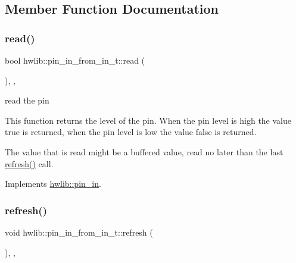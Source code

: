 \subsection{Member Function Documentation}
\mbox{\label{classhwlib_1_1pin__in__from__in__t_a981fa53647035e85ac71ec426c41b69f}} 
\subsubsection{\texorpdfstring{read()}{read()}}
{\footnotesize\ttfamily bool hwlib\+::pin\+\_\+in\+\_\+from\+\_\+in\+\_\+t\+::read (\begin{DoxyParamCaption}{ }\end{DoxyParamCaption})\hspace{0.3cm}{\ttfamily [inline]}, {\ttfamily [override]}, {\ttfamily [virtual]}}





read the pin

This function returns the level of the pin. When the pin level is high the value true is returned, when the pin level is low the value false is returned.

The value that is read might be a buffered value, read no later than the last \hyperlink{classhwlib_1_1pin__in__from__in__t_ae56094d43a2fe9d38fc52af4cfef4b2c}{refresh()} call. 

Implements \hyperlink{classhwlib_1_1pin__in_ad071bd2e17bb4af51390f6cbb728a194}{hwlib\+::pin\+\_\+in}.

\mbox{\label{classhwlib_1_1pin__in__from__in__t_ae56094d43a2fe9d38fc52af4cfef4b2c}} 
\subsubsection{\texorpdfstring{refresh()}{refresh()}}
{\footnotesize\ttfamily void hwlib\+::pin\+\_\+in\+\_\+from\+\_\+in\+\_\+t\+::refresh (\begin{DoxyParamCaption}{ }\end{DoxyParamCaption})\hspace{0.3cm}{\ttfamily [inline]}, {\ttfamily [override]}, {\ttfamily [virtual]}}





